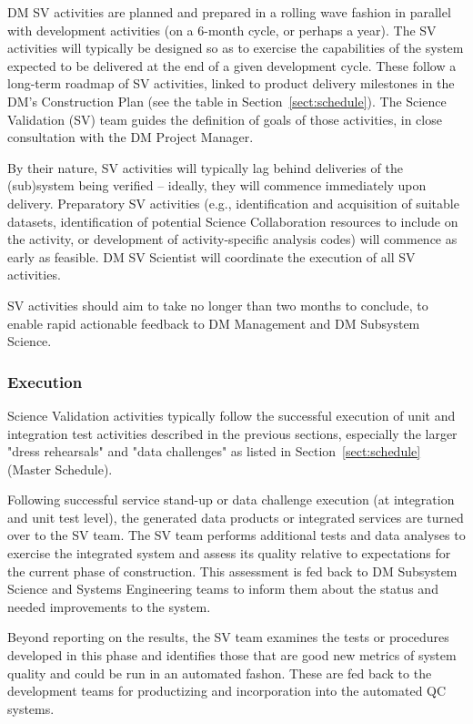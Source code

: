 DM SV activities are planned and prepared in a rolling wave fashion in
parallel with development activities (on a 6-month cycle, or perhaps a
year). The SV activities will typically be designed so as to exercise the
capabilities of the system expected to be delivered at the end of a given
development cycle. These follow a long-term roadmap of SV activities,
linked to product delivery milestones in the DM's Construction Plan (see
the table in Section~\ref{sect:schedule}).  The Science Validation (SV) team
guides the definition of goals of those activities, in close consultation
with the DM Project Manager.

By their nature, SV activities will typically lag behind
deliveries of the (sub)system being verified -- ideally, they will commence
immediately upon delivery. Preparatory SV activities (e.g., identification and
acquisition of suitable datasets, identification of potential Science
Collaboration resources to include on the activity, or development of
activity-specific analysis codes) will commence as early as feasible. DM SV
Scientist will coordinate the execution of all SV activities.

SV activities should aim to take no longer than two months to conclude, to
enable rapid actionable feedback to DM Management and DM Subsystem Science.

\subsubsection{Execution}

Science Validation activities typically follow the successful execution of
unit and integration test activities described in the previous sections,
especially the larger "dress rehearsals" and "data challenges" as
listed in Section~\ref{sect:schedule} (Master Schedule).

Following successful service stand-up or data challenge execution (at
integration and unit test level), the generated data products or integrated
services are turned over to the SV team.  The SV team performs additional
tests and data analyses to exercise the integrated system and assess its
quality relative to expectations for the current phase of construction.
This assessment is fed back to DM Subsystem Science and Systems Engineering
teams to inform them about the status and needed improvements to the system.

Beyond reporting on the results, the SV team examines the tests or
procedures developed in this phase and identifies those that are good new
metrics of system quality and could be run in an automated fashon.  These
are fed back to the development teams for productizing and incorporation
into the automated QC systems.

